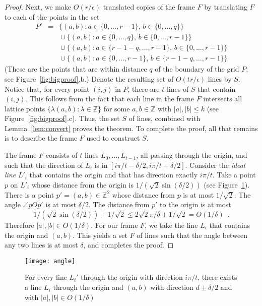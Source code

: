 \documentclass{patmorin}
\newcommand{\Z}{\mathbb{Z}}
\newcommand{\figlabel}[1]{\label{fig:#1}}
\newcommand{\figref}[1]{\mbox{Figure~\ref{fig:#1}}}
\newcommand{\lemref}[1]{Lemma~\ref{lem:#1}}
\begin{document}
\begin{proof}
Next, we make $O(r/\epsilon)$ translated copies of the frame $F$ by
translating $F$ to each of the points in the set
\begin{eqnarray*}
   P'  & = & \{(a,b) : a\in\{0,\ldots,r-1\},\, b\in\{0,\ldots,q\} \} \\
   & & {} \cup
   \{(a,b) : a\in\{0,\ldots,q\},\, b\in\{0,\ldots,r-1\} \} \\
   & & {} \cup 
   \{(a,b) : a\in\{r-1-q,\ldots,r-1\},\, b\in\{0,\ldots,r-1\} \} \\
   & & {} \cup
   \{(a,b) : a\in\{0,\ldots,r-1\},\, b\in\{r-1-q,\ldots,r-1\} \}
\end{eqnarray*}
(These are the points that are within distance $q$ of the boundary of
the grid $P$; see \figref{bigproof}.b.)  Denote the resulting set of
$O(tr/\epsilon)$ lines by $S$.  Notice that, for every point $(i,j)$ in
$P$, there are $t$ lines of $S$ that contain $(i,j)$.  This follows from
the fact that each line in the frame $F$ intersects all lattice points
$\{\lambda(a,b): \lambda\in \Z\}$ for some $a,b\in\Z$ with $|a|,|b|\le k$
(see \figref{bigproof}.c).  Thus, the set $S$ of lines, combined with
\lemref{convert} proves the theorem.  To complete the proof, all that
remains is to describe the frame $F$ used to construct $S$.

The frame $F$ consists of $t$ lines $L_0,\ldots,L_{t-1}$, all passing
through the origin, and such that the direction of $L_i$ is in $[i\pi/t
- \delta/2,i\pi/t+\delta/2]$.  Consider the \emph{ideal line} $L'_i$
that contains the origin and that has direction exactly $i\pi/t$.
Take a point $p$ on $L'_i$ whose distance from the origin is
$1/(\sqrt{2}\sin(\delta/2))$ (see \figref{angle}).  There is a point
$p'=(a,b)\in\Z^2$ whose distance from $p$ is at most $1/\sqrt{2}$.
The angle $\angle pOp'$ is at most $\delta/2$.  The distance from $p'$
to the origin is at most
\[
  1/(\sqrt{2}\sin(\delta/2))+1/\sqrt{2}
    \le 2\sqrt{2}\pi/\delta+1/\sqrt{2}
    = O(1/\delta) \enspace .
\]
Therefore $|a|,|b| \in O(1/\delta)$.  For our frame $F$, we take the line
$L_i$ that contains the origin and $(a,b)$.  This yields a set $F$ of lines
such that the angle between any two lines is at most $\delta$, and
completes the proof.
\end{proof}

\begin{figure}
  \begin{center}
    \texttt{[image: angle]}
  \end{center}
  \caption{For every line $L_i'$ through the origin with direction
$i\pi/t$, there exists a line $L_i$ through the origin and $(a,b)$ with
direction $d\pm\delta/2$ and with $|a|,|b|\in O(1/\delta)$}
  \figlabel{angle}
\end{figure}
\end{document}
